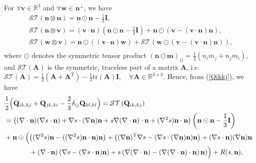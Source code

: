 \documentclass[10pt, a4paper]{article}
\newcommand\n{\mathbf{n}}
\newcommand\m{\mathbf{m}}
\newcommand\vvec{\mathbf{v}}
\newcommand\w{\mathbf{w}}
\newcommand\Qvec{\mathbf{Q}}
\newcommand\tr{\mathrm{tr}}
\begin{document}

For $\forall \vvec \in \mathbb{R}^3$ and $\forall \w \in \n^{\perp}$, we have
\begin{equation}\label{st_nm}
\begin{aligned}
& \mathcal{ST} \left( \n \otimes \n \right) = \n \odot \n - \frac{1}{3} \mathbf{I}, \\
& \mathcal{ST} (\n \otimes \vvec) = (\vvec \cdot \n) \left( \n \odot \n - \frac{1}{3} \mathbf{I} \right) + \n \odot \left(\vvec - (\vvec \cdot \n) \n \right), \\ 
& \mathcal{ST} (\w \otimes \vvec) = \n \odot \left( (\vvec \cdot \n) \w \right) + \mathcal{ST} \left( \w \odot (\vvec - (\vvec \cdot \n) \n )  \right), \\
\end{aligned}
\end{equation}
where $\odot$ denotes the symmetric tensor product $(\n \odot \m)_{ij} =  \frac{1}{2}(n_i m_j + n_j m_i)$, and $\mathcal{ST} \left( \mathbf{A} \right)$ is the symmetric, traceless part of a matrix $\mathbf{A}$, i.e. $\mathcal{ST}(\mathbf{A}) = \frac{1}{2}( \mathbf{A} + \mathbf{A}^{\mathrm{T}}) - \frac{1}{3} \tr( \mathbf{A} ) \mathbf{I}, \quad \forall \mathbf{A} \in \mathbb{R}^{3 \times 3}$. Hence, from (\ref{Qikkj}), we have
\begin{equation}\label{AE_Q_term}
  \begin{aligned}
    & \frac{1}{2} \Bigl( \Qvec_{ik,kj}  + \Qvec_{jk,ki} - \frac{2}{3} \delta_{ij} \Qvec_{kl, kl} \Bigr) = \mathcal{ST} \left( \Qvec_{ik, kj} \right) \\
    & =  \left( (\nabla \cdot \n) (\nabla s \cdot \n) + \nabla s \cdot (\nabla \n) \n + s \nabla (\nabla \cdot \n) \cdot \n + (\nabla^2 s) \n \cdot \n \right) \left(\n \odot  \n - \frac{1}{3} \mathbf{I} \right)\\
    & + \n \odot \Bigl( \left( (\nabla^2 s) \n - ((\nabla^2 s) \n \cdot \n) \n \right) + \left( (\nabla \n)^{\mathrm{T}} \nabla s - (\nabla s \cdot (\nabla \n) \n) \n \right) + (\nabla s \cdot \n)  (\nabla \n) \n  \\
    & ~~~~~~~~~~~ + (\nabla \cdot \n) \left( \nabla s - (\nabla s \cdot \n) \n \right) + s \left( \nabla (\nabla \cdot \n) -  \left( \nabla (\nabla \cdot \n) \cdot \n \right) \n \right) \Bigr) + R(s, \n), \\
  \end{aligned}
\end{equation}
\end{document}
